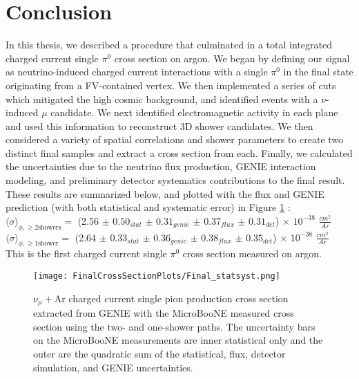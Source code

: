 \clearpage 
 \section{Conclusion}
In this thesis, we described a procedure that culminated in a total integrated charged current single $\pi^0$ cross section on argon. We began by defining our signal as neutrino-induced charged current interactions with a single $\pi^0$ in the final state originating from a FV-contained vertex.  We then implemented a series of cuts which mitigated the high cosmic background, and identified events with a $\nu$-induced $\mu$ candidate.  We next identified electromagnetic activity in each plane and used this information to reconstruct 3D shower candidates. We then considered a variety of spatial correlations and shower parameters to create two distinct final samples and extract a cross section from each.  Finally, we calculated the uncertainties due to the neutrino flux production, GENIE interaction modeling, and preliminary detector systematics contributions to the final result.  These results are summarized below, and plotted with the flux and GENIE prediction (with both statistical and systematic error) in Figure \ref{fig:genie_uboone_xsec2} :\\

\noindent $\langle \sigma\rangle_{\phi,\geq 2 \text{showers}}=$ (2.56 $\pm$ $0.50_{stat}$ $\pm$ $0.31_{genie}$ $\pm$ $0.37_{flux}$ $\pm$ $0.31_{det}$) $\times$ $10^{-38}$ $\frac{cm^2}{Ar}$ \\

\noindent $\langle \sigma\rangle_{\phi,\geq 1 \text{shower}}=$ (2.64 $\pm$ $0.33_{stat}$ $\pm$ $0.36_{genie}$ $\pm$ $0.38_{flux}$ $\pm$ $0.35_{det}$) $\times$ $10^{-38}$ $\frac{cm^2}{Ar}$ \\

\noindent This is the first charged current single $\pi^0$ cross section measured on argon.

\begin{figure}[h!]
\centering
\texttt{[image: FinalCrossSectionPlots/Final\_statsyst.png]}
\caption{ $\nu_{\mu}+\text{Ar}$ charged current single pion production cross section extracted from GENIE with the MicroBooNE measured cross section using the two- and one-shower paths. The uncertainty bars on the MicroBooNE measurements are inner statistical only and the outer are the quadratic sum of the statistical, flux, detector simulation, and GENIE uncertainties.}
\label{fig:genie_uboone_xsec2}
\end{figure}


